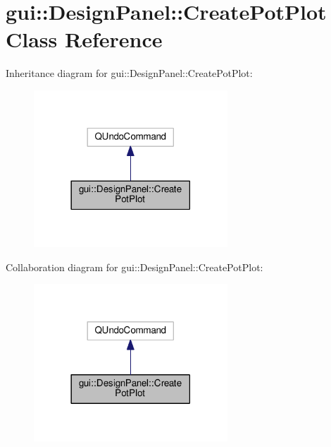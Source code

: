\hypertarget{classgui_1_1DesignPanel_1_1CreatePotPlot}{}\section{gui\+:\+:Design\+Panel\+:\+:Create\+Pot\+Plot Class Reference}
\label{classgui_1_1DesignPanel_1_1CreatePotPlot}


Inheritance diagram for gui\+:\+:Design\+Panel\+:\+:Create\+Pot\+Plot\+:\nopagebreak
\begin{figure}[H]
\begin{center}
\leavevmode
\includegraphics[width=206pt]{classgui_1_1DesignPanel_1_1CreatePotPlot__inherit__graph}
\end{center}
\end{figure}


Collaboration diagram for gui\+:\+:Design\+Panel\+:\+:Create\+Pot\+Plot\+:\nopagebreak
\begin{figure}[H]
\begin{center}
\leavevmode
\includegraphics[width=206pt]{classgui_1_1DesignPanel_1_1CreatePotPlot__coll__graph}
\end{center}
\end{figure}
